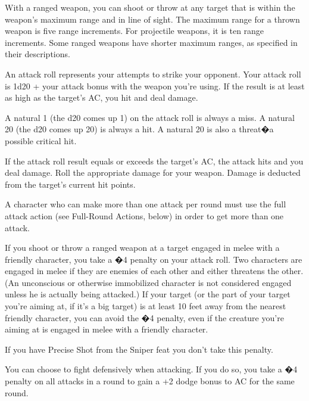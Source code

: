 With a ranged weapon, you can shoot or throw at any target that is within the weapon's maximum range and in line of sight. The maximum range for a thrown weapon is five range increments. For projectile weapons, it is ten range increments. Some ranged weapons have shorter maximum ranges, as specified in their descriptions.

An attack roll represents your attempts to strike your opponent.  Your attack roll is 1d20 + your attack bonus with the weapon you're using. If the result is at least as high as the target's AC, you hit and deal damage.

A natural 1 (the d20 comes up 1) on the attack roll is always a miss. A natural 20 (the d20 comes up 20) is always a hit. A natural 20 is also a threat�a possible critical hit.

If the attack roll result equals or exceeds the target's AC, the attack hits and you deal damage. Roll the appropriate damage for your weapon. Damage is deducted from the target's current hit points.

A character who can make more than one attack per round must use the full attack action (see Full-Round Actions, below) in order to get more than one attack.

If you shoot or throw a ranged weapon at a target engaged in melee with a friendly character, you take a �4 penalty on your attack roll. Two characters are engaged in melee if they are enemies of each other and either threatens the other. (An unconscious or otherwise immobilized character is not considered engaged unless he is actually being attacked.) If your target (or the part of your target you're aiming at, if it's a big target) is at least 10 feet away from the nearest friendly character, you can avoid the �4 penalty, even if the creature you're aiming at is engaged in melee with a friendly character.

If you have Precise Shot from the Sniper feat you don't take this penalty.

You can choose to fight defensively when attacking. If you do so, you take a �4 penalty on all attacks in a round to gain a +2 dodge bonus to AC for the same round.

